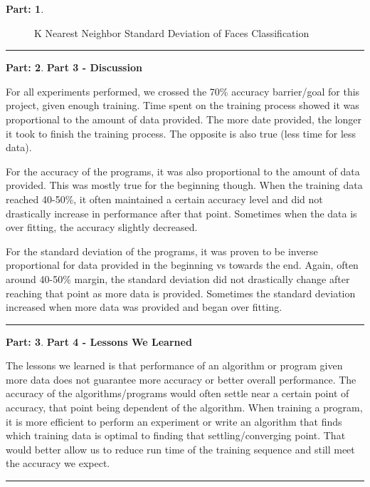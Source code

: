 \documentclass{article}
\theoremstyle{definition}
\def\fline{\rule{0.75\linewidth}{0.5pt}}
\newcommand{\finishline}{\begin{center}\fline\end{center}}
\newtheorem*{solution*}{Part: }
\newenvironment{solution}{\begin{solution*}}{{\finishline} \end{solution*}}
\begin{document}
\begin{solution}
\item
\begin{figure}[h!]
            \centering
            \item 
            \caption{K Nearest Neighbor Standard Deviation of Faces Classification}
        \end{figure}

\begin{newpage}
\end{newpage}


\end{solution}

\begin{solution} \textbf{Part 3 - Discussion}

\item For all experiments performed, we crossed the 70\% accuracy barrier/goal for this project, given enough training. Time spent on the training process showed it was proportional to the amount of data provided. The more date provided, the longer it took to finish the training process. The opposite is also true (less time for less data).
\item For the accuracy of the programs, it was also proportional to the amount of data provided. This was mostly true for the beginning though. When the training data reached 40-50\%, it often maintained a certain accuracy level and did not drastically increase in performance after that point. Sometimes when the data is over fitting, the accuracy slightly decreased. 
\item For the standard deviation of the programs, it was proven to be inverse proportional for data provided in the beginning vs towards the end. Again, often around 40-50\% margin, the standard deviation did not drastically change after reaching that point as more data is provided. Sometimes the standard deviation increased when more data was provided and began over fitting. 

\end{solution}


\begin{solution} \textbf{Part 4 - Lessons We Learned}

\item The lessons we learned is that performance of an algorithm or program given more data does not guarantee more accuracy or better overall performance. The accuracy of the algorithms/programs would often settle near a certain point of accuracy, that point being dependent of the algorithm. When training a program, it is more efficient to perform an experiment or write an algorithm that finds which training data is optimal to finding that settling/converging point. That would better allow us to reduce run time of the training sequence and still meet the accuracy we expect.  

\end{solution}
\end{document}
